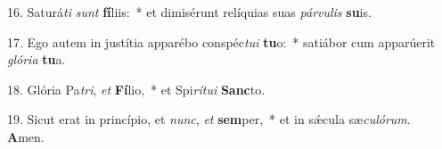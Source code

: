16. Saturá\textit{ti} \textit{sunt} \textbf{fí}liis:~*  et dimisérunt relíquias suas \textit{pár}\textit{vu}\textit{lis} \textbf{su}is.\

17. Ego autem in justítia apparébo conspéc\textit{tu}\textit{i} \textbf{tu}o:~*  satiábor cum apparúerit \textit{gló}\textit{ri}\textit{a} \textbf{tu}a.\

18. Glória Pa\textit{tri}, \textit{et} \textbf{Fí}lio,~*  et Spi\textit{rí}\textit{tu}\textit{i} \textbf{Sanc}to.\

19. Sicut erat in princípio, et \textit{nunc}, \textit{et} \textbf{sem}per,~*  et in sǽcula sæ\textit{cu}\textit{ló}\textit{rum}. \textbf{A}men.\

